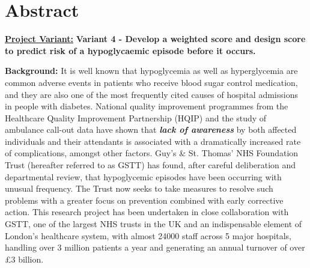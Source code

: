 
\section*{Abstract}


    \textbf{\underline{Project Variant:}} \textbf{ Variant 4 - Develop a weighted score and design score to predict risk of a hypoglycaemic episode before it occurs.} 

    \vspace{10pt}
    \par{ \noindent \textbf{Background:} It is well known that hypoglycemia as well as hyperglycemia are common adverse events in patients who receive blood sugar control medication, and they are also one of the most frequently cited causes of hospital admissions in people with diabetes. National quality improvement programmes from the Healthcare Quality Improvement Partnership (HQIP) and the study of ambulance call-out data have shown that \textbf{\textit{lack of awareness}} by both affected individuals and their attendants is associated with a dramatically increased rate of complications, amongst other factors. Guy's \& St. Thomas' NHS Foundation Trust (hereafter referred to as GSTT) has found, after careful deliberation and departmental review, that hypoglycemic episodes have been occurring with unusual frequency. The Trust now seeks to take measures to resolve such problems with a greater focus on prevention combined with early corrective action. This research project has been undertaken in close collaboration with GSTT, one of the largest NHS trusts in the UK and an indispensable element of London's healthcare system, with almost 24000 staff across 5 major hospitals, handling over 3 million patients a year and generating an annual turnover of over \pounds3 billion.}

